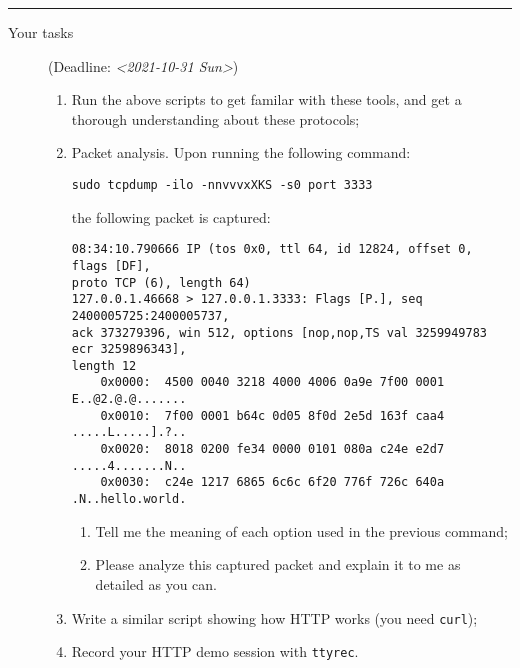 \documentclass{article} [NO-DEFAULT-PACKAGES] \usepackage{wx672hyperref}
\begin{document}
\noindent\rule{\textwidth}{0.5pt}

\begin{description}
\item[{Your tasks}] (Deadline: \textit{<2021-10-31 Sun>})

\begin{enumerate}
\item Run the above scripts to get familar with these tools, and get a thorough understanding about these protocols;

\item Packet analysis. Upon running the following command:

\begin{verbatim}
sudo tcpdump -ilo -nnvvvxXKS -s0 port 3333
\end{verbatim}


the following packet is captured:

\begin{verbatim}
08:34:10.790666 IP (tos 0x0, ttl 64, id 12824, offset 0, flags [DF],
proto TCP (6), length 64)
127.0.0.1.46668 > 127.0.0.1.3333: Flags [P.], seq 2400005725:2400005737,
ack 373279396, win 512, options [nop,nop,TS val 3259949783 ecr 3259896343],
length 12
    0x0000:  4500 0040 3218 4000 4006 0a9e 7f00 0001  E..@2.@.@.......
    0x0010:  7f00 0001 b64c 0d05 8f0d 2e5d 163f caa4  .....L.....].?..
    0x0020:  8018 0200 fe34 0000 0101 080a c24e e2d7  .....4.......N..
    0x0030:  c24e 1217 6865 6c6c 6f20 776f 726c 640a  .N..hello.world.
\end{verbatim}

\begin{enumerate}
\item Tell me the meaning of each option used in the previous command;

\item Please analyze this captured packet and explain it to me as detailed as you can.
\end{enumerate}

\item Write a similar script showing how HTTP works (you need \texttt{curl});

\item Record your HTTP demo session with \texttt{ttyrec}.
\end{enumerate}
\end{description}
\end{document}
